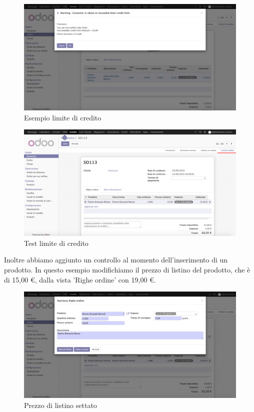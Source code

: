 \begin{figure}[H]
	\begin{center} \includegraphics[scale=0.3]{figures/check_limit}
		\caption[Esempio limite di credito]{Esempio limite di credito}
		\label{fig:check_limit}
	\end{center}
\end{figure}
\begin{figure}[H]
	\begin{center} \includegraphics[scale=0.3]{figures/second_test}
		\caption[Test limite di credito]{Test limite di credito}
		\label{fig:second_test}
	\end{center}
\end{figure}
\newpage
Inoltre abbiamo aggiunto un controllo al momento dell'inserimento di un prodotto.
In questo esempio modifichiamo il prezzo di listino del prodotto, che è di 15,00 €, dalla vista 'Righe ordine' con 19,00 €.
\begin{figure}[H]
	\begin{center} \includegraphics[scale=0.3]{figures/list_price}
		\caption[Prezzo di listino settato]{Prezzo di listino settato}
		\label{fig:list_price}
	\end{center}
\end{figure}

